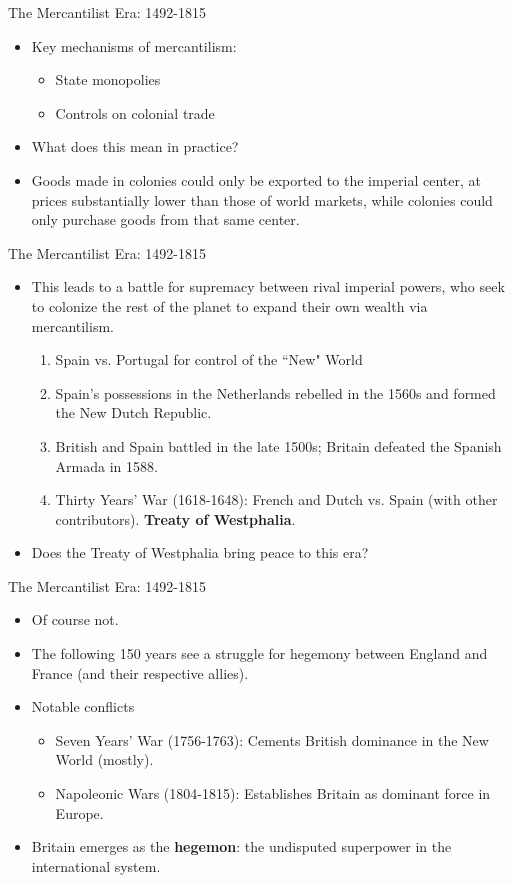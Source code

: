 \documentclass{beamer}
\begin{document}
\begin{frame}{\LARGE The Mercantilist Era: 1492-1815}
	\begin{itemize}
		\item Key mechanisms of mercantilism:
			\begin{itemize}
				\item State monopolies	
				\item Controls on colonial trade
		\end{itemize}	
		\item What does this mean in practice? \pause
		\item Goods made in colonies could only be exported to the imperial center, at prices substantially lower than those of world markets, while colonies could only purchase goods from that same center.
	\end{itemize}
\end{frame}

\begin{frame}{\LARGE The Mercantilist Era: 1492-1815}
	\begin{itemize}
		\item This leads to a battle for supremacy between rival imperial powers, who seek to colonize the rest of the planet to expand their own wealth via mercantilism.
		\begin{enumerate}
			\item Spain vs. Portugal for control of the ``New" World
			\item Spain’s possessions in the Netherlands rebelled in the 1560s and formed the New Dutch Republic.
			\item British and Spain battled in the late 1500s; Britain defeated the Spanish Armada in 1588.
			\item Thirty Years' War (1618-1648): French and Dutch vs. Spain (with other contributors). \textbf{Treaty of Westphalia}. \pause
		\end{enumerate}
		\item Does the Treaty of Westphalia bring peace to this era?
	\end{itemize}
\end{frame}

\begin{frame}{\LARGE The Mercantilist Era: 1492-1815}
	\begin{itemize}
		\item Of course not. \pause
		\item The following 150 years see a struggle for hegemony between England and France (and their respective allies).
		\item Notable conflicts
			\begin{itemize}
				\item Seven Years’ War (1756-1763): Cements British dominance in the New World (mostly).
				\item Napoleonic Wars (1804-1815): Establishes Britain as dominant force in Europe.				
			\end{itemize}
		\item Britain emerges as the \textbf{hegemon}: the undisputed superpower in the international system.
	\end{itemize}
\end{frame}
\end{document}
